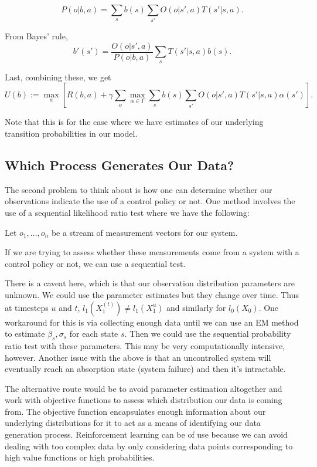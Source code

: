 \documentclass[english]{article}
\numberwithin{equation}{section}
\begin{document}
$$P(o|b,a) = \sum_s b(s) \sum_{s'} O(o|s',a)T(s'|s,a).$$

From Bayes' rule,
$$
b'(s') = \frac{O(o|s',a)}{P(o|b,a)}\sum_s T(s'|s,a)b(s).
$$

Last, combining these, we get
$$
U(b) := \max_a \left[ R(b,a) + \gamma \sum_o \max_{\alpha\in \Gamma} \sum_s b(s) \sum_{s'} O(o|s',a)T(s'|s,a) \alpha(s') \right]. 
$$

Note that this is for the case where we have estimates of our underlying transition probabilities in our model.

\subsection{Which Process Generates Our Data?}

The second problem to think about is how one can determine whether our observations indicate the use of a control policy or not. One method involves the use of a sequential likelihood ratio test where we have the following:

Let $o_1,\ldots,o_n$ be a stream of measurement vectors for our system.

If we are trying to assess whether these measurements come from a system with a control policy or not, we can use a sequential test.

There is a caveat here, which is that our observation distribution parameters are unknown. We could use the parameter estimates but they change over time. Thus at timesteps $u$ and $t$, $l_1(X_1^{(t)}) \neq l_1(X_1^{u})$ and similarly for $l_0(X_0)$. One workaround for this is via collecting enough data until we can use an EM method to estimate $\beta_s, \sigma_s$ for each state $s$. Then we could use the sequential probability ratio test with these parameters. This may be very computationally intensive, however. Another issue with the above is that an uncontrolled system will eventually reach an absorption state (system failure) and then it's intractable.

The alternative route would be to avoid parameter estimation altogether and work with objective functions to assess which distribution our data is coming from. The objective function encapsulates enough information about our underlying distributions for it to act as a means of identifying our data generation process. Reinforcement learning can be of use because we can avoid dealing with too complex data by only considering data points corresponding to high value functions or high probabilities.
\end{document}
